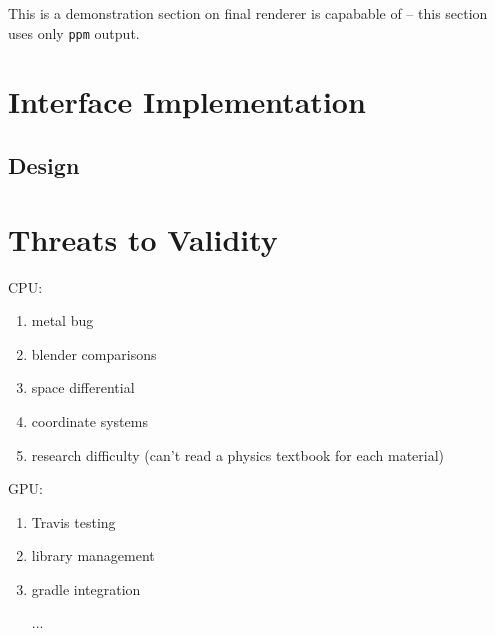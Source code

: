  \label{ch:methods:renderer:parallel:demo}

This is a demonstration section on final renderer is capabable of -- this section uses only \texttt{ppm} output.

\section{Interface Implementation} \label{ch:methods:interface}

\subsection{Design} \label{ch:methods:interface:design}

\section{Threats to Validity} \label{ch:methods:threats}

CPU:
\begin{enumerate}
  \item metal bug
  \item blender comparisons
  \item space differential
  \item coordinate systems
  \item research difficulty (can't read a physics textbook for each material)
\end{enumerate}

GPU:
\begin{enumerate}
  \item Travis testing
  \item library management
  \item gradle integration
  \item [...]
\end{enumerate}

